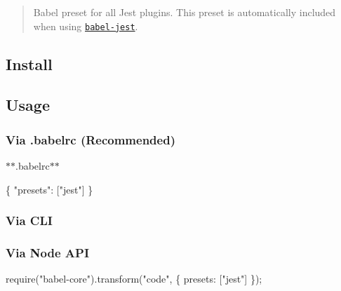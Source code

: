 \begin{quote}
Babel preset for all Jest plugins. This preset is automatically included when using \href{https://github.com/facebook/jest/tree/master/packages/babel-jest}{\tt babel-\/jest}. \end{quote}


\subsection*{Install}




\subsection*{Usage}

\subsubsection*{Via {\ttfamily .babelrc} (Recommended)}

$\ast$$\ast$.babelrc$\ast$$\ast$


\begin{DoxyCode}
\{
  "presets": ["jest"]
\}
\end{DoxyCode}


\subsubsection*{Via C\+LI}




\subsubsection*{Via Node A\+PI}


\begin{DoxyCode}
require("babel-core").transform("code", \{
  presets: ["jest"]
\});
\end{DoxyCode}
 
